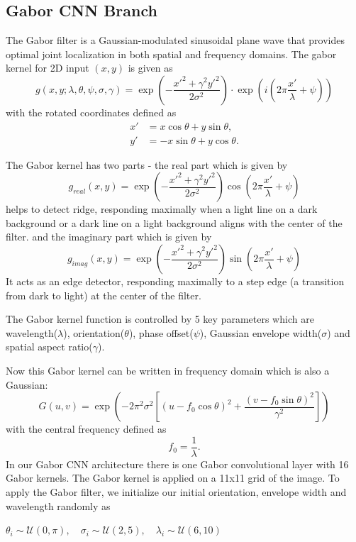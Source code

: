 \documentclass[preprint,12pt]{elsarticle}
\begin{document}
\FloatBarrier
\subsection{Gabor CNN Branch}

The Gabor filter is a Gaussian-modulated sinusoidal plane wave that provides optimal joint localization in both spatial and frequency domains. The gabor kernel for 2D input $(x,y)$ is given as
$$g(x, y; \lambda, \theta, \psi, \sigma, \gamma) = \exp\left(-\frac{x'^2 + \gamma^2 y'^2}{2\sigma^2}\right) \cdot \exp\left(i \left(2\pi \frac{x'}{\lambda} + \psi\right)\right)$$
with the rotated coordinates defined as
\[
\begin{aligned*}
x' &= x \cos\theta + y \sin\theta, \\
y' &= -x \sin\theta + y \cos\theta.
\end{aligned*}
\]

The Gabor kernel has two parts - the real part which is given by
$$g_{real}(x, y) = \exp\left(-\frac{x'^2 + \gamma^2 y'^2}{2\sigma^2}\right) \cos\left(2\pi \frac{x'}{\lambda} + \psi\right)$$
helps to detect ridge, responding maximally when a light line on a dark background or a dark line on a light background aligns with the center of the filter. 
and the imaginary part which is given by 
$$g_{imag}(x, y) = \exp\left(-\frac{x'^2 + \gamma^2 y'^2}{2\sigma^2}\right) \sin\left(2\pi \frac{x'}{\lambda} + \psi\right)$$
It acts as an edge detector, responding maximally to a step edge (a transition from dark to light) at the center of the filter.

The Gabor kernel function is controlled by 5 key parameters which are wavelength($\lambda$), orientation($\theta$), phase offset($\psi$), Gaussian envelope width($\sigma$) and spatial aspect ratio($\gamma$).

Now this Gabor kernel can be written in frequency domain which is also a Gaussian:
\[
G(u, v)
=
\exp\!\left(
- 2 \pi^2 \sigma^2
\left[
(u - f_0 \cos\theta)^2
+ \frac{(v - f_0 \sin\theta)^2}{\gamma^2}
\right]
\right)
\]
with the central frequency defined as
\[
f_0 = \frac{1}{\lambda}.
\]
In our Gabor CNN architecture there is one Gabor convolutional layer with 16 Gabor kernels. The Gabor kernel is applied on a 11x11 grid of the image. To apply the Gabor filter, we initialize our initial orientation, envelope width and wavelength randomly as 

$\theta_i \sim \mathcal{U}(0, \pi), \quad
 \sigma_i \sim \mathcal{U}(2, 5), \quad
 \lambda_i \sim \mathcal{U}(6, 10)$
\end{document}
